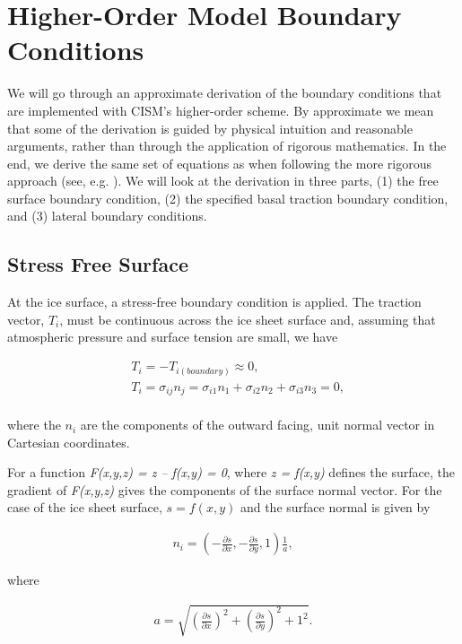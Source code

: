 
\section{Higher-Order Model Boundary Conditions}
\label{sc:higher-order-bcs}

We will go through an approximate derivation of the boundary conditions that are implemented with CISM's higher-order scheme. By approximate we mean that some of the derivation is guided by physical intuition and reasonable arguments, rather than through the application of rigorous mathematics. In the end, we derive the same set of equations as when following the more rigorous approach (see, e.g. \citet{DUKOWICZ:2010wb}). We will look at the derivation in three parts, (1) the free surface boundary condition, (2) the specified basal traction boundary condition, and (3) lateral boundary conditions.

\subsection{Stress Free Surface}
At the ice surface, a stress-free boundary condition is applied. The traction vector, $T_i$, must be continuous across the ice sheet surface and, assuming that atmospheric pressure and surface tension are small, we have

\begin{align*}
 & T_{i}=-T_{i(boundary)}\approx 0, \\ 
 & T_{i}=\sigma _{ij}n_{j}=\sigma _{i1}n_{1}+\sigma _{i2}n_{2}+\sigma _{i3}n_{3}=0, \\
\end{align*}

where the $n_i$ are the components of the outward facing, unit normal vector in Cartesian coordinates.

For a function \textit{F(x,y,z) = z -- f(x,y) = 0}, where \textit{z = f(x,y)} defines the surface, the gradient of \textit{F(x,y,z)} gives the components of the surface normal vector. For the case of the ice sheet surface, $s = f(x,y)$ and the surface normal is given by

\begin{align*}
n_{i}=\left( -\frac{\partial s}{\partial x},-\frac{\partial s}{\partial y},1 \right)\frac{1}{a},
\end{align*}

where

\begin{align*}
a=\sqrt{\left( \frac{\partial s}{\partial x} \right)^{2}+\left( \frac{\partial s}{\partial y} \right)^{2}+1^{2}}.
\end{align*}

